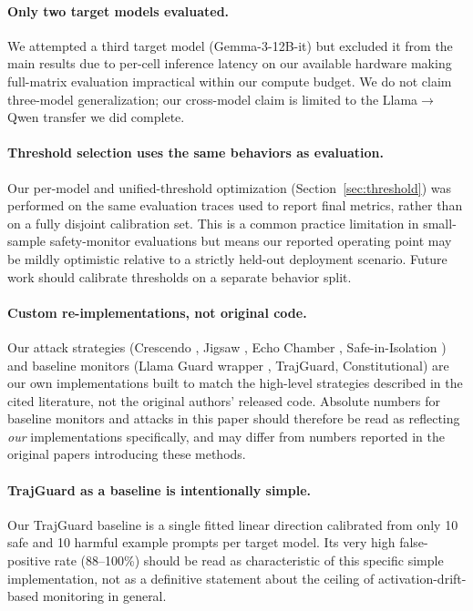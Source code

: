 \documentclass[11pt]{article}
\begin{document}
\paragraph{Only two target models evaluated.} We attempted a third target model (Gemma-3-12B-it) but excluded it from the main results due to per-cell inference latency on our available hardware making full-matrix evaluation impractical within our compute budget. We do not claim three-model generalization; our cross-model claim is limited to the Llama$\to$Qwen transfer we did complete.

\paragraph{Threshold selection uses the same behaviors as evaluation.} Our per-model and unified-threshold optimization (Section~\ref{sec:threshold}) was performed on the same evaluation traces used to report final metrics, rather than on a fully disjoint calibration set. This is a common practice limitation in small-sample safety-monitor evaluations but means our reported operating point may be mildly optimistic relative to a strictly held-out deployment scenario. Future work should calibrate thresholds on a separate behavior split.

\paragraph{Custom re-implementations, not original code.} Our attack strategies (Crescendo \citep{russinovich2024crescendo}, Jigsaw \citep{yang2024jigsaw}, Echo Chamber \citep{alobaid2026echochamber}, Safe-in-Isolation \citep{srivastav2025safeinisolation}) and baseline monitors (Llama Guard wrapper \citep{inan2023llamaguard}, TrajGuard, Constitutional) are our own implementations built to match the high-level strategies described in the cited literature, not the original authors' released code. Absolute numbers for baseline monitors and attacks in this paper should therefore be read as reflecting \emph{our} implementations specifically, and may differ from numbers reported in the original papers introducing these methods.

\paragraph{TrajGuard as a baseline is intentionally simple.} Our TrajGuard baseline is a single fitted linear direction calibrated from only 10 safe and 10 harmful example prompts per target model. Its very high false-positive rate (88--100\%) should be read as characteristic of this specific simple implementation, not as a definitive statement about the ceiling of activation-drift-based monitoring in general.
\end{document}
